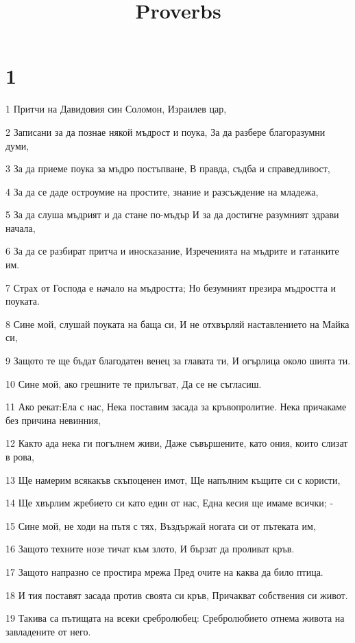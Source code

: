 

\title{Proverbs}


\chapter{1}

\par 1 Притчи на Давидовия син Соломон, Израилев цар,
\par 2 Записани за да познае някой мъдрост и поука, За да разбере благоразумни думи,
\par 3 За да приеме поука за мъдро постъпване, В правда, съдба и справедливост,
\par 4 За да се даде остроумие на простите, знание и разсъждение на младежа,
\par 5 За да слуша мъдрият и да стане по-мъдър И за да достигне разумният здрави начала,
\par 6 За да се разбират притча и иносказание, Изреченията на мъдрите и гатанките им.
\par 7 Страх от Господа е начало на мъдростта; Но безумният презира мъдростта и поуката.
\par 8 Сине мой, слушай поуката на баща си, И не отхвърляй наставлението на Майка си,
\par 9 Защото те ще бъдат благодатен венец за главата ти, И огърлица около шията ти.
\par 10 Сине мой, ако грешните те прилъгват, Да се не съгласиш.
\par 11 Ако рекат:Ела с нас, Нека поставим засада за кръвопролитие. Нека причакаме без причина невинния,
\par 12 Както ада нека ги погълнем живи, Даже съвършените, като ония, които слизат в рова,
\par 13 Ще намерим всякакъв скъпоценен имот, Ще напълним къщите си с користи,
\par 14 Ще хвърлим жребието си като един от нас, Една кесия ще имаме всички; -
\par 15 Сине мой, не ходи на пътя с тях, Въздържай ногата си от пътеката им,
\par 16 Защото техните нозе тичат към злото, И бързат да проливат кръв.
\par 17 Защото напразно се простира мрежа Пред очите на каква да било птица.
\par 18 И тия поставят засада против своята си кръв, Причакват собствения си живот.
\par 19 Такива са пътищата на всеки сребролюбец: Сребролюбието отнема живота на завладените от него.
